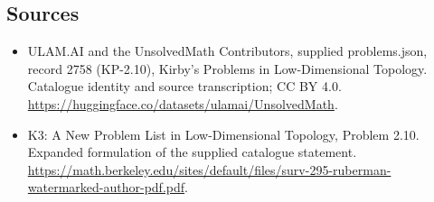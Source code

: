\documentclass[11pt,a4paper]{article}
\begin{document}
\subsection{Sources}
\begin{itemize}
\item[S1] ULAM.AI and the UnsolvedMath Contributors, supplied problems.json, record 2758 (KP-2.10), Kirby's Problems in Low-Dimensional Topology. Catalogue identity and source transcription; CC BY 4.0.
\url{https://huggingface.co/datasets/ulamai/UnsolvedMath}.
\item[S2] K3: A New Problem List in Low-Dimensional Topology, Problem 2.10. Expanded formulation of the supplied catalogue statement.
\url{https://math.berkeley.edu/sites/default/files/surv-295-ruberman-watermarked-author-pdf.pdf}.
\end{itemize}
\end{document}
